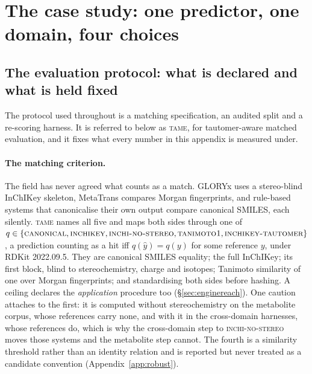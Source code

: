 \section{The case study: one predictor, one domain, four choices}
\label{app:casestudy}

\subsection{The evaluation protocol: what is declared and what is held fixed}
\label{sec:tame}

The protocol used throughout is a matching specification, an audited split and a re-scoring
harness. It is referred to below as \textsc{tame}, for tautomer-aware matched evaluation, and it
fixes what every number in this appendix is measured under.

\paragraph{The matching criterion.} The field has never agreed what counts as a match. GLORYx uses a
stereo-blind InChIKey skeleton, MetaTrans compares Morgan fingerprints, and rule-based systems that
canonicalise their own output compare canonical SMILES, each silently. \textsc{tame} names all five and maps both
sides through one of $q \in \{\textsc{canonical}, \textsc{inchikey}, \textsc{inchi-no-stereo},
\textsc{tanimoto1}, \textsc{inchikey-tautomer}\}$, a prediction counting as a hit iff
$q(\hat{y}) = q(y)$ for some reference $y$, under RDKit 2022.09.5. They are canonical SMILES
equality; the full InChIKey; its first block, blind to stereochemistry, charge and isotopes;
Tanimoto similarity of one over Morgan fingerprints; and standardising both sides before hashing. A
ceiling declares the \emph{application} procedure too (\S\ref{sec:enginereach}). One caution attaches
to the first: it is computed without stereochemistry on the metabolite corpus, whose references carry
none, and with it in the cross-domain harnesses, whose references do, which is why the cross-domain
step to \textsc{inchi-no-stereo} moves those systems and the metabolite step cannot. The fourth is a
similarity threshold rather than an identity relation and is reported but never treated as a
candidate convention (Appendix~\ref{app:robust}).


